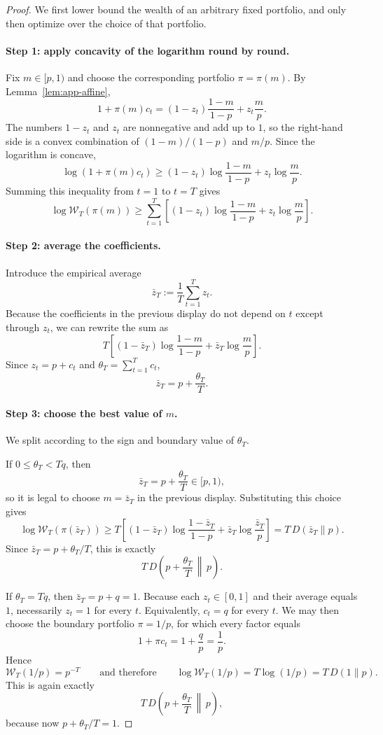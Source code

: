 \documentclass[11pt]{article}
\newcommand{\1}{\mathbf{1}}
\begin{document}
\begin{proof}
We first lower bound the wealth of an arbitrary fixed portfolio, and only then optimize over the choice of that portfolio.

\paragraph{Step 1: apply concavity of the logarithm round by round.}
Fix $m\in[p,1)$ and choose the corresponding portfolio $\pi=\pi(m)$. By Lemma~\ref{lem:app-affine},
\[
1+\pi(m)c_t
=
(1-z_t)\frac{1-m}{1-p}
+
z_t\frac{m}{p}.
\]
The numbers $1-z_t$ and $z_t$ are nonnegative and add up to $1$, so the right-hand side is a convex combination of $(1-m)/(1-p)$ and $m/p$. Since the logarithm is concave,
\[
\log(1+\pi(m)c_t)
\ge
(1-z_t)\log\frac{1-m}{1-p}
+
z_t\log\frac{m}{p}.
\]
Summing this inequality from $t=1$ to $t=T$ gives
\[
\log \mathcal W_T(\pi(m))
\ge
\sum_{t=1}^T
\left[
(1-z_t)\log\frac{1-m}{1-p}
+
z_t\log\frac{m}{p}
\right].
\]

\paragraph{Step 2: average the coefficients.}
Introduce the empirical average
\[
\bar z_T:=\frac1T\sum_{t=1}^T z_t.
\]
Because the coefficients in the previous display do not depend on $t$ except through $z_t$, we can rewrite the sum as
\[
T\left[(1-\bar z_T)\log\frac{1-m}{1-p}+\bar z_T\log\frac{m}{p}\right].
\]
Since $z_t=p+c_t$ and $\theta_T=\sum_{t=1}^T c_t$,
\[
\bar z_T=p+\frac{\theta_T}{T}.
\]

\paragraph{Step 3: choose the best value of $m$.}
We split according to the sign and boundary value of $\theta_T$.

If $0\le \theta_T<Tq$, then
\[
\bar z_T=p+\frac{\theta_T}{T}\in[p,1),
\]
so it is legal to choose $m=\bar z_T$ in the previous display. Substituting this choice gives
\[
\log \mathcal W_T(\pi(\bar z_T))
\ge
T\left[(1-\bar z_T)\log\frac{1-\bar z_T}{1-p}+\bar z_T\log\frac{\bar z_T}{p}\right]
=
T\,D(\bar z_T\|p).
\]
Since $\bar z_T=p+\theta_T/T$, this is exactly
\[
T\,D\!\left(p+\frac{\theta_T}{T}\,\middle\|\,p\right).
\]

If $\theta_T=Tq$, then $\bar z_T=p+q=1$. Because each $z_t\in[0,1]$ and their average equals $1$, necessarily $z_t=1$ for every $t$. Equivalently, $c_t=q$ for every $t$. We may then choose the boundary portfolio $\pi=1/p$, for which every factor equals
\[
1+\pi c_t=1+\frac{q}{p}=\frac{1}{p}.
\]
Hence
\[
\mathcal W_T(1/p)=p^{-T}
\qquad\text{and therefore}\qquad
\log \mathcal W_T(1/p)=T\log(1/p)=T\,D(1\|p).
\]
This is again exactly
\[
T\,D\!\left(p+\frac{\theta_T}{T}\,\middle\|\,p\right),
\]
because now $p+\theta_T/T=1$.


\end{proof}
\end{document}
